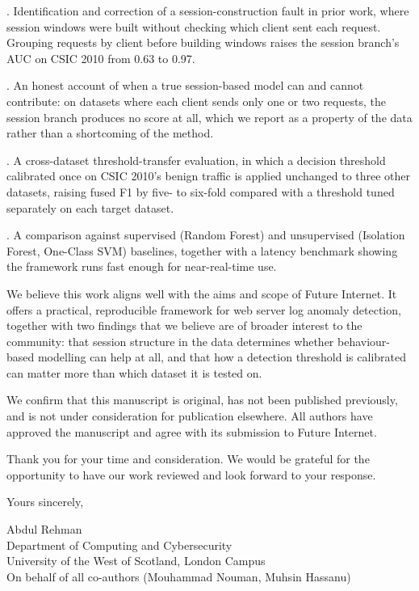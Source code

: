 \documentclass[11pt]{article}
\begin{document}
. Identification and correction of a session-construction fault in prior work, where session windows were built without checking which client sent each request. Grouping requests by client before building windows raises the session branch's AUC on CSIC 2010 from 0.63 to 0.97.

. An honest account of when a true session-based model can and cannot contribute: on datasets where each client sends only one or two requests, the session branch produces no score at all, which we report as a property of the data rather than a shortcoming of the method.

. A cross-dataset threshold-transfer evaluation, in which a decision threshold calibrated once on CSIC 2010's benign traffic is applied unchanged to three other datasets, raising fused F1 by five- to six-fold compared with a threshold tuned separately on each target dataset.

. A comparison against supervised (Random Forest) and unsupervised (Isolation Forest, One-Class SVM) baselines, together with a latency benchmark showing the framework runs fast enough for near-real-time use.

\vspace{\baselineskip}

We believe this work aligns well with the aims and scope of Future Internet. It offers a practical, reproducible framework for web server log anomaly detection, together with two findings that we believe are of broader interest to the community: that session structure in the data determines whether behaviour-based modelling can help at all, and that how a detection threshold is calibrated can matter more than which dataset it is tested on.

We confirm that this manuscript is original, has not been published previously, and is not under consideration for publication elsewhere. All authors have approved the manuscript and agree with its submission to Future Internet.

Thank you for your time and consideration. We would be grateful for the opportunity to have our work reviewed and look forward to your response.

\vspace{2\baselineskip}

Yours sincerely,

\vspace{3\baselineskip}

Abdul Rehman \\
Department of Computing and Cybersecurity \\
University of the West of Scotland, London Campus \\
On behalf of all co-authors (Mouhammad Nouman, Muhsin Hassanu)
\end{document}

